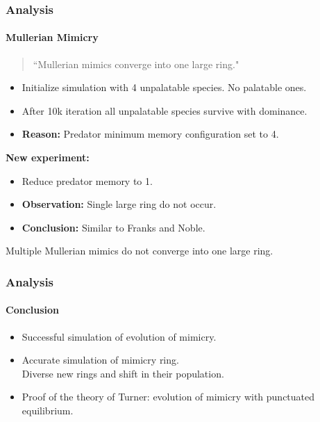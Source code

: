 \frame
{
	\frametitle{Analysis}
	\framesubtitle{Mullerian Mimicry}

	\begin{quote}
		``Mullerian mimics converge into one large ring."
	\end{quote}
	
	\begin{itemize}
		\item Initialize simulation with 4 unpalatable species. No palatable ones.
		\item After 10k iteration all unpalatable species survive with dominance.
		\item \textbf{Reason:} Predator minimum memory configuration set to 4.
	\end{itemize}
	
	\textbf{New experiment:}
	\begin{itemize}
		\item Reduce predator memory to 1.\\
		\item \textbf{Observation:} Single large ring do not occur. 
		\item \textbf{Conclusion:} Similar to Franks and Noble.\\
	\end{itemize}	
	Multiple Mullerian mimics do not converge into one large ring.

}

\frame
{
	\frametitle{Analysis}
	\framesubtitle{Conclusion}

	\begin{itemize}
		\item Successful simulation of evolution of mimicry.
		\item Accurate simulation of mimicry ring.\\
		Diverse new rings and shift in their population.
		\item Proof of the theory of Turner: evolution of mimicry with punctuated equilibrium.
	\end{itemize}
}